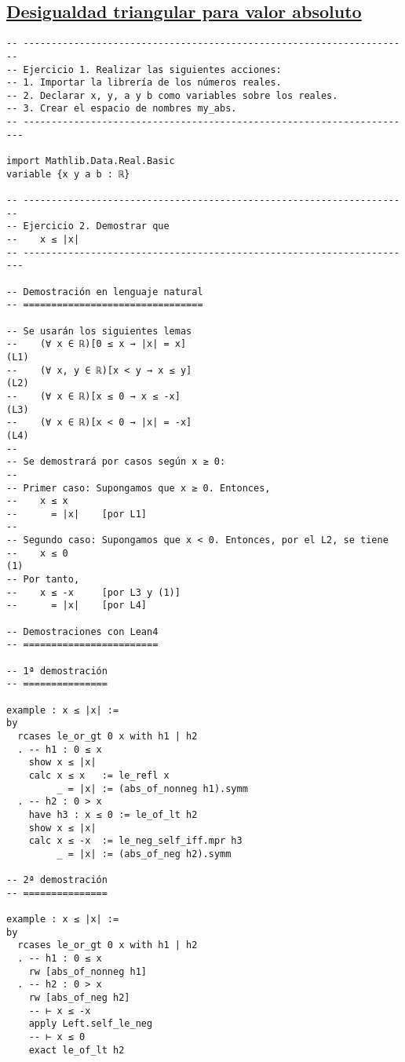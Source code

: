 \subsection{\href{./src/Logica/Desigualdad\_triangular\_para\_valor\_absoluto.lean}{Desigualdad triangular para valor absoluto}}
\label{sec:orgf88ef06}
\begin{verbatim}
-- ---------------------------------------------------------------------
-- Ejercicio 1. Realizar las siguientes acciones:
-- 1. Importar la librería de los números reales.
-- 2. Declarar x, y, a y b como variables sobre los reales.
-- 3. Crear el espacio de nombres my_abs.
-- ----------------------------------------------------------------------

import Mathlib.Data.Real.Basic
variable {x y a b : ℝ}

-- ---------------------------------------------------------------------
-- Ejercicio 2. Demostrar que
--    x ≤ |x|
-- ----------------------------------------------------------------------

-- Demostración en lenguaje natural
-- ================================

-- Se usarán los siguientes lemas
--    (∀ x ∈ ℝ)[0 ≤ x → |x| = x]                                     (L1)
--    (∀ x, y ∈ ℝ)[x < y → x ≤ y]                                    (L2)
--    (∀ x ∈ ℝ)[x ≤ 0 → x ≤ -x]                                      (L3)
--    (∀ x ∈ ℝ)[x < 0 → |x| = -x]                                    (L4)
--
-- Se demostrará por casos según x ≥ 0:
--
-- Primer caso: Supongamos que x ≥ 0. Entonces,
--    x ≤ x
--      = |x|    [por L1]
--
-- Segundo caso: Supongamos que x < 0. Entonces, por el L2, se tiene
--    x ≤ 0                                                          (1)
-- Por tanto,
--    x ≤ -x     [por L3 y (1)]
--      = |x|    [por L4]

-- Demostraciones con Lean4
-- ========================

-- 1ª demostración
-- ===============

example : x ≤ |x| :=
by
  rcases le_or_gt 0 x with h1 | h2
  . -- h1 : 0 ≤ x
    show x ≤ |x|
    calc x ≤ x   := le_refl x
         _ = |x| := (abs_of_nonneg h1).symm
  . -- h2 : 0 > x
    have h3 : x ≤ 0 := le_of_lt h2
    show x ≤ |x|
    calc x ≤ -x  := le_neg_self_iff.mpr h3
         _ = |x| := (abs_of_neg h2).symm

-- 2ª demostración
-- ===============

example : x ≤ |x| :=
by
  rcases le_or_gt 0 x with h1 | h2
  . -- h1 : 0 ≤ x
    rw [abs_of_nonneg h1]
  . -- h2 : 0 > x
    rw [abs_of_neg h2]
    -- ⊢ x ≤ -x
    apply Left.self_le_neg
    -- ⊢ x ≤ 0
    exact le_of_lt h2


\end{verbatim}

